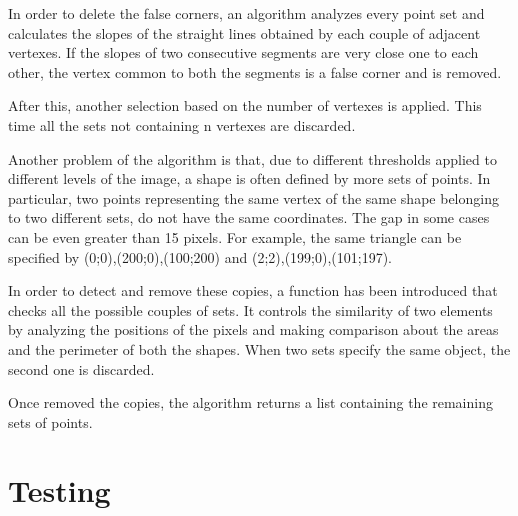 		In order to delete the false corners, an algorithm analyzes every point set and calculates the slopes of the straight lines obtained by each couple of adjacent vertexes. 
		If the slopes of two consecutive segments are very close one to each other, the vertex common to both the segments is a false corner and is removed.
		

		
		After this, another selection based on the number of vertexes is applied. This time all the sets not containing n vertexes are discarded.
		
		 
				
		
		Another problem of the algorithm is that, due to different thresholds applied to different levels of the image, a shape is often defined by more sets of points.
		In particular, two points representing the same vertex of the same shape belonging to two different sets, do not have the same coordinates.
		The gap in some cases can be even greater than 15 pixels. 
		For example, the same triangle can be specified by {(0;0),(200;0),(100;200)} and {(2;2),(199;0),(101;197)}. 
		
		

		In order to detect and remove these copies, a function has been introduced that checks all the possible couples of sets. 
		It controls the similarity of two elements by analyzing the positions of the pixels and making comparison about the areas and the perimeter of both the shapes. 
		When two sets specify the same object, the second one is discarded. 
		
		Once removed the copies, the algorithm returns a list containing the remaining sets of points.

\begin{comment}		
		various parameters like the positions of pixels, the areas and the positions of each couple of 
	
		Then, the corners of each shape are "uniti" thanks to an algorithm of fi
		
		In order to detect the douls
\end{comment}
	

	

	\section{Testing}

